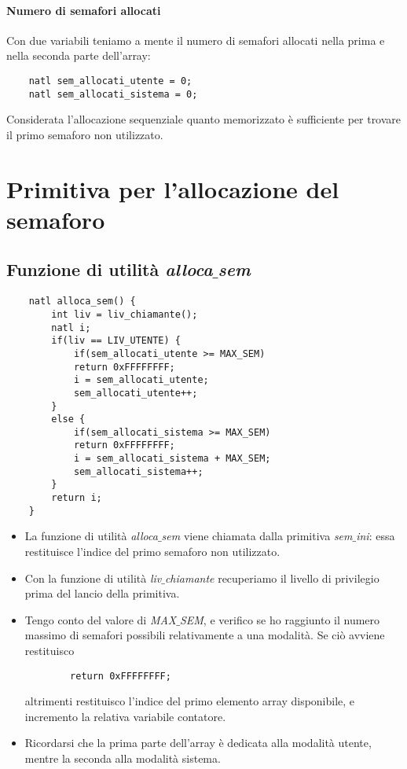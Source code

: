 \paragraph{Numero di semafori allocati} Con due variabili teniamo a mente il numero di semafori allocati nella prima e nella seconda parte dell'array:
\begin{verbatim}
	natl sem_allocati_utente = 0;
	natl sem_allocati_sistema = 0;
\end{verbatim}
Considerata l'allocazione sequenziale quanto memorizzato è sufficiente per trovare il primo semaforo non utilizzato.

\section{Primitiva per l'allocazione del semaforo}
\subsection{Funzione di utilità \emph{alloca$\_$sem}}
\small 
\begin{verbatim}
	natl alloca_sem() {
		int liv = liv_chiamante();
		natl i;
		if(liv == LIV_UTENTE) {
			if(sem_allocati_utente >= MAX_SEM)
			return 0xFFFFFFFF;
			i = sem_allocati_utente;
			sem_allocati_utente++;
		}
		else {
			if(sem_allocati_sistema >= MAX_SEM)
			return 0xFFFFFFFF;
			i = sem_allocati_sistema + MAX_SEM;
			sem_allocati_sistema++;
		}
		return i;
	}
\end{verbatim}
\normalsize 
\begin{itemize}	
	\item La funzione di utilità \emph{alloca$\_$sem} viene chiamata dalla primitiva \emph{sem$\_$ini}: essa restituisce l'indice del primo semaforo non utilizzato.
	\item Con la funzione di utilità \emph{liv$\_$chiamante} recuperiamo il livello di privilegio prima del lancio della primitiva. 
	\item Tengo conto del valore di \emph{MAX$\_$SEM}, e verifico se ho raggiunto il numero massimo di semafori possibili relativamente a una modalità. Se ciò avviene restituisco
	\begin{verbatim}
		return 0xFFFFFFFF;
	\end{verbatim}
	altrimenti restituisco l'indice del primo elemento array disponibile, e incremento la relativa variabile contatore. 
	\item Ricordarsi che la prima parte dell'array è dedicata alla modalità utente, mentre la seconda alla modalità sistema.
\end{itemize}
